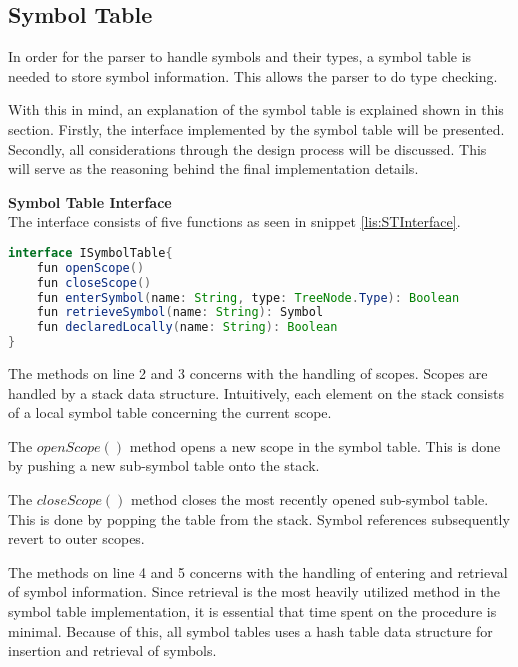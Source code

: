 \subsection{Symbol Table}
\label{sec:symbolTable}
In order for the parser to handle symbols and their types, a symbol table is needed to store symbol information.
This allows the parser to do type checking.

With this in mind, an explanation of the symbol table is explained shown in this section.
Firstly, the interface implemented by the symbol table will be presented.
Secondly, all considerations through the design process will be discussed.
This will serve as the reasoning behind the final implementation details.

\textbf{Symbol Table Interface}\\
The interface consists of five functions as seen in snippet \ref{lis:STInterface}.

\begin{lstlisting}[language=java,label=lis:STInterface,caption=The interface which all symbol table implementations must implement.]
interface ISymbolTable{
	fun openScope()
	fun closeScope()
	fun enterSymbol(name: String, type: TreeNode.Type): Boolean
	fun retrieveSymbol(name: String): Symbol
	fun declaredLocally(name: String): Boolean
}
\end{lstlisting}

The methods on line 2 and 3 concerns with the handling of scopes.
Scopes are handled by a stack data structure.
Intuitively, each element on the stack consists of a local symbol table concerning the current scope.

The $openScope()$ method opens a new scope in the symbol table.
This is done by pushing a new sub-symbol table onto the stack.

The $closeScope()$ method closes the most recently opened sub-symbol table.
This is done by popping the table from the stack.
Symbol references subsequently revert to outer scopes.

The methods on line 4 and 5 concerns with the handling of entering and retrieval of symbol information.
Since retrieval is the most heavily utilized method in the symbol table implementation, it is essential that time spent on the procedure is minimal.
Because of this, all symbol tables uses a hash table data structure for insertion and retrieval of symbols. 

